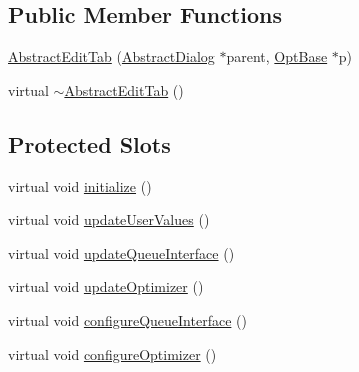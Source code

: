 \subsection*{Public Member Functions}
\begin{DoxyCompactItemize}
\item 
\hyperlink{classGlobalSearch_1_1AbstractEditTab_a7c6f355f4e1ee393bb2dd93425e6f02a}{Abstract\-Edit\-Tab} (\hyperlink{classGlobalSearch_1_1AbstractDialog}{Abstract\-Dialog} $\ast$parent, \hyperlink{classGlobalSearch_1_1OptBase}{Opt\-Base} $\ast$p)
\item 
virtual \hyperlink{classGlobalSearch_1_1AbstractEditTab_ab4d202689e2018ad8db8b23a485d091d}{$\sim$\-Abstract\-Edit\-Tab} ()
\end{DoxyCompactItemize}
\subsection*{Protected Slots}
\begin{DoxyCompactItemize}
\item 
virtual void \hyperlink{classGlobalSearch_1_1AbstractEditTab_afb9fd8fbcf71d7287a8117ce4d75a00b}{initialize} ()
\item 
virtual void \hyperlink{classGlobalSearch_1_1AbstractEditTab_a3c241c0807a7f1dff4e75a7d9f2354fc}{update\-User\-Values} ()
\item 
virtual void \hyperlink{classGlobalSearch_1_1AbstractEditTab_aec415636f7b9aa295f8ae6d9a9035184}{update\-Queue\-Interface} ()
\item 
virtual void \hyperlink{classGlobalSearch_1_1AbstractEditTab_ad92c42eafb4b2bf681f3032148083441}{update\-Optimizer} ()
\item 
virtual void \hyperlink{classGlobalSearch_1_1AbstractEditTab_a4bd14eb377b74813bfc1474b92432567}{configure\-Queue\-Interface} ()
\item 
virtual void \hyperlink{classGlobalSearch_1_1AbstractEditTab_a4cc539eb78a2bcb984e46f73cbe2dfcd}{configure\-Optimizer} ()
\end{DoxyCompactItemize}
